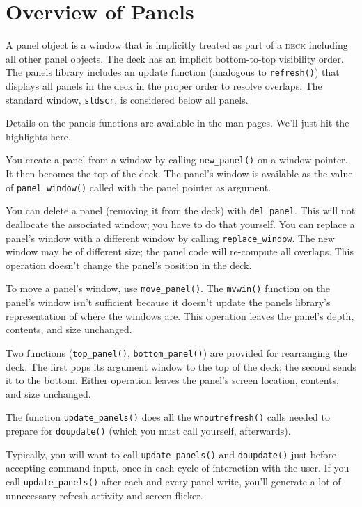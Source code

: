 \section{Overview of Panels}

\label{f0:poverview}A panel object is a window that is implicitly treated as part of a
\textsc{deck} including all other panel objects.  The deck has an implicit
bottom-to-top visibility order.  The panels library includes an update
function (analogous to \texttt{refresh()}) that displays all panels in the
deck in the proper order to resolve overlaps.  The standard window,
\texttt{stdscr}, is considered below all panels. 

Details on the panels functions are available in the man pages.  We'll just
hit the highlights here. 

You create a panel from a window by calling \texttt{new\_panel()} on a
window pointer.  It then becomes the top of the deck.  The panel's window
is available as the value of \texttt{panel\_window()} called with the
panel pointer as argument.

You can delete a panel (removing it from the deck) with \texttt{del\_panel}.
This will not deallocate the associated window; you have to do that yourself.
You can replace a panel's window with a different window by calling
\texttt{replace\_window}.  The new window may be of different size;
the panel code will re-compute all overlaps.  This operation doesn't
change the panel's position in the deck. 

To move a panel's window, use \texttt{move\_panel()}.  The
\texttt{mvwin()} function on the panel's window isn't sufficient because it
doesn't update the panels library's representation of where the windows are.
This operation leaves the panel's depth, contents, and size unchanged. 

Two functions (\texttt{top\_panel()}, \texttt{bottom\_panel()}) are
provided for rearranging the deck.  The first pops its argument window to the
top of the deck; the second sends it to the bottom.  Either operation leaves
the panel's screen location, contents, and size unchanged. 

The function \texttt{update\_panels()} does all the
\texttt{wnoutrefresh()} calls needed to prepare for
\texttt{doupdate()} (which you must call yourself, afterwards). 

Typically, you will want to call \texttt{update\_panels()} and
\texttt{doupdate()} just before accepting command input, once in each cycle
of interaction with the user.  If you call \texttt{update\_panels()} after
each and every panel write, you'll generate a lot of unnecessary refresh
activity and screen flicker.


